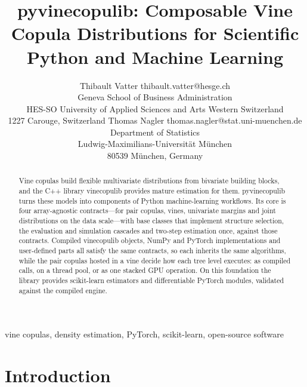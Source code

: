 \documentclass[twoside,11pt]{article}
\newcommand{\pkg}[1]{\textsf{#1}}
\begin{document}
\title{pyvinecopulib: Composable Vine Copula Distributions for Scientific
Python and Machine Learning}

\author{\name Thibault Vatter \email thibault.vatter@hesge.ch \\
       \addr Geneva School of Business Administration\\
       HES-SO University of Applied Sciences and Arts Western Switzerland\\
       1227 Carouge, Switzerland
       \AND
       \name Thomas Nagler \email thomas.nagler@stat.uni-muenchen.de \\
       \addr Department of Statistics\\
       Ludwig-Maximilians-Universit\"at M\"unchen\\
       80539 M\"unchen, Germany}


\maketitle

\begin{abstract}%
Vine copulas build flexible multivariate distributions from bivariate
building blocks, and the C++ library vinecopulib provides mature estimation
for them. \pkg{pyvinecopulib} turns these models into components of Python
machine-learning workflows. Its core is four array-agnostic contracts---for
pair copulas, vines, univariate margins and joint distributions on the data
scale---with base classes that implement structure selection, the evaluation
and simulation cascades and two-step estimation once, against those
contracts. Compiled vinecopulib objects, NumPy and PyTorch implementations and
user-defined parts all satisfy the same contracts, so each inherits the same
algorithms, while the pair copulas hosted in a vine decide how each tree level
executes: as compiled calls, on a thread pool, or as one stacked GPU
operation. On this foundation the library provides scikit-learn estimators and
differentiable PyTorch modules, validated against the compiled engine.
\end{abstract}

\begin{keywords}
  vine copulas, density estimation, PyTorch, scikit-learn, open-source
  software
\end{keywords}

\section{Introduction}
\end{document}
